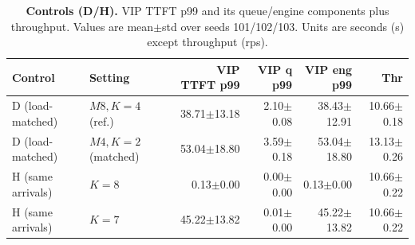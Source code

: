 \begin{table}[t]
  \centering
  \caption{\textbf{Controls (D/H).}
  \textsf{VIP} TTFT p99 and its queue/engine components plus throughput.
  Values are mean$\pm$std over seeds 101/102/103. Units are seconds (s) except throughput (rps).}
  \label{tab:controls}
  \small
  \setlength{\tabcolsep}{5pt}
  \begin{tabular}{llrrrr}
    \toprule
    Control & Setting & \textsf{VIP} TTFT p99 & \textsf{VIP} q p99 & \textsf{VIP} eng p99 & Thr \\
    \midrule
    D (load-matched) & $M8, K{=}4$ (ref.) & 38.71$\pm$13.18 & 2.10$\pm$0.08 & 38.43$\pm$12.91 & 10.66$\pm$0.18 \\
    D (load-matched) & $M4, K{=}2$ (matched) & 53.04$\pm$18.80 & 3.59$\pm$0.18 & 53.04$\pm$18.80 & 13.13$\pm$0.26 \\
    \midrule
    H (same arrivals) & $K{=}8$ & 0.13$\pm$0.00 & 0.00$\pm$0.00 & 0.13$\pm$0.00 & 10.66$\pm$0.22 \\
    H (same arrivals) & $K{=}7$ & 45.22$\pm$13.82 & 0.01$\pm$0.00 & 45.22$\pm$13.82 & 10.66$\pm$0.22 \\
    \bottomrule
  \end{tabular}
\end{table}

